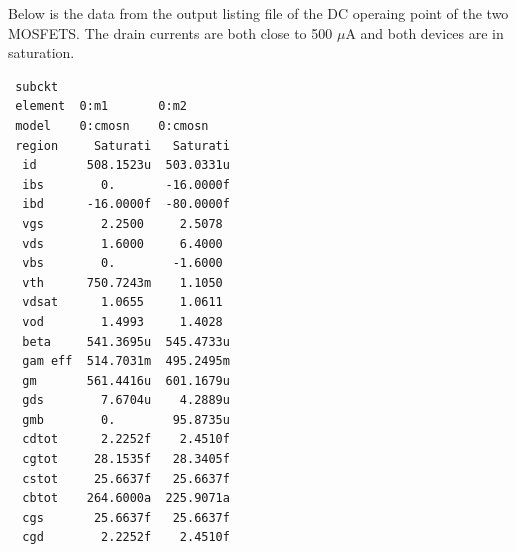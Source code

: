 \documentclass[12pt]{article}
\begin{document}
Below is the data from the output listing file of the DC operaing point of the two MOSFETS. The drain currents are both close to 500 $\mu$A and both devices are in saturation.
\begin{lstlisting}
 subckt                        
 element  0:m1       0:m2      
 model    0:cmosn    0:cmosn   
 region     Saturati   Saturati
  id       508.1523u  503.0331u
  ibs        0.       -16.0000f
  ibd      -16.0000f  -80.0000f
  vgs        2.2500     2.5078 
  vds        1.6000     6.4000 
  vbs        0.        -1.6000 
  vth      750.7243m    1.1050 
  vdsat      1.0655     1.0611 
  vod        1.4993     1.4028 
  beta     541.3695u  545.4733u
  gam eff  514.7031m  495.2495m
  gm       561.4416u  601.1679u
  gds        7.6704u    4.2889u
  gmb        0.        95.8735u
  cdtot      2.2252f    2.4510f
  cgtot     28.1535f   28.3405f
  cstot     25.6637f   25.6637f
  cbtot    264.6000a  225.9071a
  cgs       25.6637f   25.6637f
  cgd        2.2252f    2.4510f
\end{lstlisting}
\end{document}
